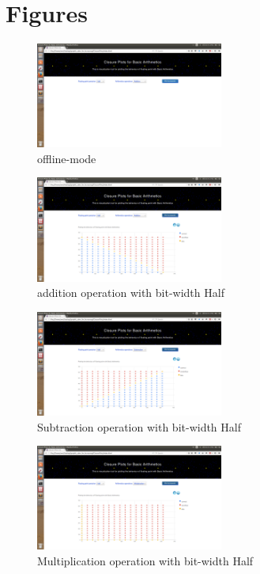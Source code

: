 \documentclass[11pt]{article}
\begin{document}
\section*{Figures}
\begin{figure}[h]
    \centering
    \includegraphics[width=0.55\textwidth]{offline}
    \caption{offline-mode}
    \label{offline}
\end{figure}
\begin{figure}[h]
    \centering
    \includegraphics[width=0.55\textwidth]{half-add}
    \caption{addition operation with bit-width Half}
    \label{half-add}
\end{figure}
\begin{figure}[h]
    \centering
    \includegraphics[width=0.55\textwidth]{half-sub}
    \caption{Subtraction operation with bit-width Half}
    \label{half-sub}
\end{figure}
\begin{figure}[h]
    \centering
    \includegraphics[width=0.55\textwidth]{half-mult}
    \caption{Multiplication operation with bit-width Half}
    \label{half-mult}
\end{figure}
\end{document}
